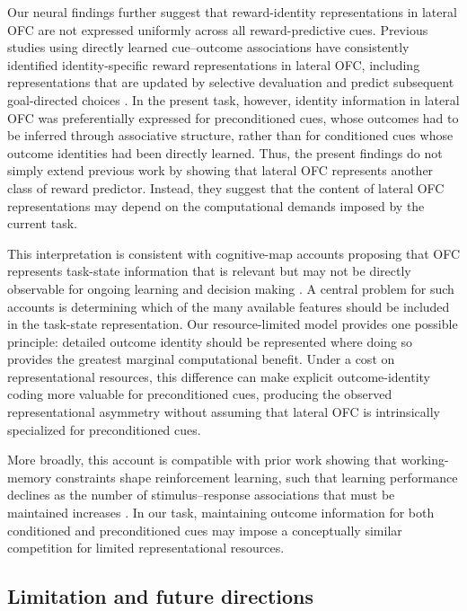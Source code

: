 \documentclass[12pt,letterpaper]{article}
\begin{document}
Our neural findings further suggest that reward-identity representations in lateral OFC are not expressed uniformly across all reward-predictive cues. Previous studies using directly learned cue--outcome associations have consistently identified identity-specific reward representations in lateral OFC, including representations that are updated by selective devaluation and predict subsequent goal-directed choices \cite{howard2015identity,howard2017identity,howard2018identity,liuyaoatt24,witkowski2026identity}. In the present task, however, identity information in lateral OFC was preferentially expressed for preconditioned cues, whose outcomes had to be inferred through associative structure, rather than for conditioned cues whose outcome identities had been directly learned. Thus, the present findings do not simply extend previous work by showing that lateral OFC represents another class of reward predictor. Instead, they suggest that the content of lateral OFC representations may depend on the computational demands imposed by the current task.

This interpretation is consistent with cognitive-map accounts proposing that OFC represents task-state information that is relevant but may not be directly observable for ongoing learning and decision making \cite{wilson2014orbitofrontal,schuck2016human,niv2019learning}. A central problem for such accounts is determining which of the many available features should be included in the task-state representation. Our resource-limited model provides one possible principle: detailed outcome identity should be represented where doing so provides the greatest marginal computational benefit. Under a cost on representational resources, this difference can make explicit outcome-identity coding more valuable for preconditioned cues, producing the observed representational asymmetry without assuming that lateral OFC is intrinsically specialized for preconditioned cues. 

More broadly, this account is compatible with prior work showing that working-memory constraints shape reinforcement learning, such that learning performance declines as the number of stimulus–response associations that must be maintained increases \cite{collins2012much,collins2018tortoise}. In our task, maintaining outcome information for both conditioned and preconditioned cues may impose a conceptually similar competition for limited representational resources.


\subsection*{Limitation and future directions}
\end{document}
